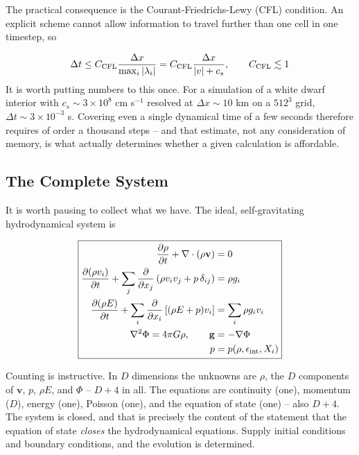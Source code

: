 \documentclass[notoc]{tufte-handout}
\renewcommand{\vec}[1]{\mathbf{#1}}
\newcommand{\del}{\vec{\nabla}}
\begin{document}
The practical consequence is the Courant-Friedrichs-Lewy (CFL) condition. An explicit scheme cannot allow information to travel further than one cell in one timestep, so

\begin{equation}
\Delta t \le C_{\rm CFL} \frac{\Delta x}{\max_i \left| \lambda_i \right|} = C_{\rm CFL} \frac{\Delta x}{|v| + c_s}, \qquad C_{\rm CFL} \lesssim 1
\end{equation}
%
It is worth putting numbers to this once. For a simulation of a white dwarf interior with $c_s \sim 3 \times 10^8$ cm s$^{-1}$ resolved at $\Delta x \sim 10$ km on a $512^3$ grid, $\Delta t \sim 3 \times 10^{-3}$ s. Covering even a single dynamical time of a few seconds therefore requires of order a thousand steps -- and that estimate, not any consideration of memory, is what actually determines whether a given calculation is affordable.

\subsection{The Complete System}

It is worth pausing to collect what we have. The ideal, self-gravitating hydrodynamical system is

\begin{equation}
\boxed{
\begin{aligned}
\frac{\partial \rho}{\partial t} + \del\cdot (\rho\vec{v}) & = 0 \\
\frac{\partial(\rho {v}_i)}{\partial t} + \sum_j \frac{\partial}{\partial x_j} \left( \rho v_i v_j + p \, \delta_{ij} \right) & = \rho g_i \\
\frac{\partial (\rho E)}{\partial t} + \sum_i \frac{\partial}{\partial x_i} \left[ (\rho E + p) v_i \right] & = \sum_i \rho g_i v_i \\
\del^2 \Phi = 4\pi G \rho, \qquad \vec{g} & = -\del\Phi \\
p & = p(\rho, \epsilon_{\rm int}, X_i)
\end{aligned}
}
\end{equation}

Counting is instructive. In $D$ dimensions the unknowns are $\rho$, the $D$ components of $\vec{v}$, $p$, $\rho E$, and $\Phi$ -- $D+4$ in all. The equations are continuity (one), momentum ($D$), energy (one), Poisson (one), and the equation of state (one) -- also $D+4$.  The system is closed, and that is precisely the content of the statement that the equation of state {\it closes} the hydrodynamical equations. Supply initial conditions and boundary conditions, and the evolution is determined.
\end{document}
